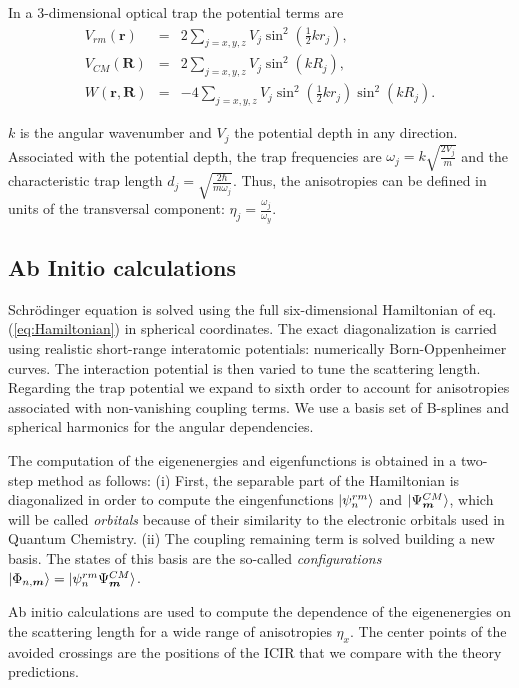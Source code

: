 \documentclass[aps,pre,twocolumn,superscriptaddress,showpacs]{revtex4-1}
\newcommand{\bfeq}[1]{{\boldsymbol{#1}}}
\begin{document}
In a 3-dimensional optical trap the potential terms are
\begin{eqnarray}
V_{rm}(\bfeq{r}) &=& 2 \sum_{j=x,y,z} V_j \sin^2 \left(\frac{1}{2}k r_j \right), \\
V_{CM}(\bfeq{R}) &=& 2 \sum_{j=x,y,z} V_j \sin^2 \left(k R_j \right), \\
W(\bfeq{r}, \bfeq{R}) &=& -4 \sum_{j=x,y,z} V_j \sin^2 \left(\frac{1}{2}k r_j \right) \sin^2 \left(k R_j \right).
\end{eqnarray}
		
$k$ is the angular wavenumber and $V_j$ the potential depth in any direction. Associated with the potential depth, the trap frequencies are $\omega_j = k\sqrt{\frac{2V_j}{m}}$ and the
 characteristic trap length $d_j = \sqrt{\frac{2\hbar}{m\omega_j}}$. Thus, the anisotropies can be defined in units of the transversal component: $\eta_j = \frac{\omega_j}{\omega_y}$.
	
	
\subsection{Ab Initio calculations} \label{subsec:Ab_initio}
Schrödinger equation is solved using the full six-dimensional Hamiltonian of eq.(\ref{eq:Hamiltonian}) in spherical coordinates. The exact 	diagonalization is carried using realistic 
short-range interatomic potentials: numerically Born-Oppenheimer curves. The interaction potential is then varied to tune the scattering length. Regarding the trap potential we 
expand to sixth order to account for anisotropies associated with non-vanishing coupling terms.  We use a basis set of B-splines and spherical harmonics for the angular dependencies.
\cite{PhysRevA.84.062710}
		
The computation of the eigenenergies and eigenfunctions is obtained in a two-step method as follows: (i) First, the separable part of the Hamiltonian is diagonalized in order to compute
the eingenfunctions $\ket{\psi^{rm}_n}$ and $\ket{\Psi^{CM}_{\bfeq{m}}}$, which will be called \textit{orbitals} because of their similarity to the electronic orbitals used in Quantum Chemistry.
(ii) The coupling remaining term is solved building a new basis. The states of this basis are the so-called \textit{configurations} $\ket{\Phi_{n, \bfeq{m}}} = \ket{\psi^{rm}_n \Psi^{CM}_{\bfeq{m}}}$.  
		
Ab initio calculations are used to compute the dependence of the eigenenergies on the scattering length for a wide range of anisotropies $\eta_x$. The center points of the avoided crossings 
are the positions of the ICIR that we compare with the theory predictions.
\end{document}
